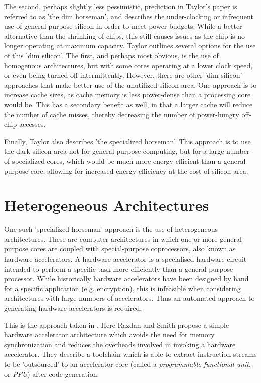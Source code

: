 \documentclass{UoYCSproject}
\begin{document}
The second, perhaps slightly less pessimistic, prediction in Taylor's paper
is referred to as 'the dim horseman', and describes the under-clocking or infrequent use of
general-purpose silicon in order to meet power budgets. While a better alternative than the shrinking
of chips, this still causes issues as the chip is no longer operating at maximum capacity.
Taylor outlines several options for the use of this 'dim silicon'. The first, and perhaps most obvious,
is the use of homogenous architectures, but with some cores operating at a lower clock speed, or
even being turned off intermittently. However, there are other 'dim silicon' approaches that make better
use of the unutilized silicon area. One approach is to increase cache sizes, as cache memory is less
power-dense than a processing core would be. This has a secondary benefit as well, in that a larger
cache will reduce the number of cache misses, thereby decreasing the number of power-hungry off-chip
accesses.

Finally, Taylor also describes 'the specialized horseman'. This approach is to use the dark silicon area
not for general-purpose computing, but for a large number of specialized cores, which would be much
more energy efficient than a general-purpose core, allowing for increased energy efficiency at the
cost of silicon area.

\section{Heterogeneous Architectures}

One such 'specialized horseman' approach is the use of heterogeneous architectures.
These are computer architectures in which one or more general-purpose cores are coupled with special-purpose coprocessors,
also known as hardware accelerators. A hardware accelerator is a specialised hardware circuit intended to perform a
specific task more efficiently than a general-purpose processor. While historically hardware accelerators have been designed by
hand for a specific application (e.g. encryption), this is infeasible when considering architectures
with large numbers of accelerators. Thus an automated approach to generating hardware accelerators is required.

This is the approach taken in \cite{high-performance-microarchitecture}. Here Razdan and Smith propose a simple
hardware accelerator architecture which avoids the need for memory synchronization and reduces the overheads involved in
invoking a hardware accelerator. They describe a toolchain which is able to extract instruction streams to be 'outsourced' to an
accelerator core (called a \textit{programmable functional unit}, or \textit{PFU}) after code generation.
\end{document}
